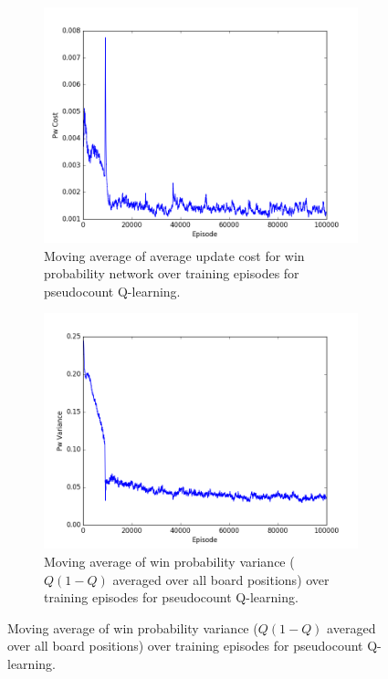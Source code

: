 \documentclass{article}
\begin{document}
\begin{figure}[!ht]
\centering
\begin{subfigure}[t]{.45\textwidth}
  \centering
      \includegraphics[width=1\textwidth]{pics/7x7_count_Pw_cost.png}
  \caption{Moving average of average update cost for win probability network over training episodes for pseudocount Q-learning.}
  \label{fig:count_cost}
\end{subfigure}\hfill
\begin{subfigure}[t]{.45\textwidth}
  \centering
      \includegraphics[width=1\textwidth]{pics/7x7_count_Pw_var.png}
  \caption{Moving average of win probability variance ($Q(1-Q)$ averaged over all board positions) over training episodes for pseudocount Q-learning.}

\end{subfigure}
\end{figure}
\end{document}
